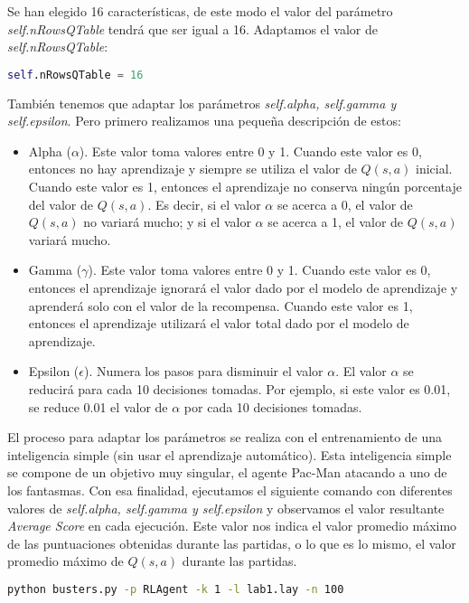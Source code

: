 \documentclass[11pt]{exam}
\begin{document}
Se han elegido 16 características, de este modo el valor del parámetro \textit{self.nRowsQTable} tendrá que ser igual a 16. Adaptamos el valor de \textit{self.nRowsQTable}:

\begin{lstlisting}[language=python, basicstyle=\footnotesize]
self.nRowsQTable = 16
\end{lstlisting}

También tenemos que adaptar los parámetros \textit{self.alpha, self.gamma y self.epsilon}. Pero primero realizamos una pequeña descripción de estos:

\begin{itemize}
	\item Alpha ($\alpha$). Este valor toma valores entre 0 y 1. Cuando este valor es 0, entonces no hay aprendizaje y siempre se utiliza el valor de $Q(s,a)$ inicial. Cuando este valor es 1, entonces el aprendizaje no conserva ningún porcentaje del valor de $Q(s,a)$. Es decir, si el valor $\alpha$ se acerca a 0, el valor de $Q(s,a)$ no variará mucho; y si el valor $\alpha$ se acerca a 1, el valor de $Q(s,a)$ variará mucho.
	\item Gamma ($\gamma$). Este valor toma valores entre 0 y 1. Cuando este valor es 0, entonces el aprendizaje ignorará el valor dado por el modelo de aprendizaje y aprenderá solo con el valor de la recompensa. Cuando este valor es 1, entonces el aprendizaje utilizará el valor total dado por el modelo de aprendizaje.
	\item Epsilon ($\epsilon$). Numera los pasos para disminuir el valor $\alpha$. El valor $\alpha$ se reducirá para cada 10 decisiones tomadas. Por ejemplo, si este valor es 0.01, se reduce 0.01 el valor de $\alpha$ por cada 10 decisiones tomadas.
\end{itemize}

El proceso para adaptar los parámetros se realiza con el entrenamiento de una inteligencia simple (sin usar el aprendizaje automático). Esta inteligencia simple se compone de un objetivo muy singular, el agente Pac-Man atacando a uno de los fantasmas. Con esa finalidad, ejecutamos el siguiente comando con diferentes valores de \textit{self.alpha, self.gamma y self.epsilon} y observamos el valor resultante \textit{Average Score} en cada ejecución. Este valor nos indica el valor promedio máximo de las puntuaciones obtenidas durante las partidas, o lo que es lo mismo, el valor promedio máximo de $Q(s,a)$ durante las partidas.

\begin{lstlisting}[language=bash, basicstyle=\footnotesize]
python busters.py -p RLAgent -k 1 -l lab1.lay -n 100
\end{lstlisting}
\end{document}
